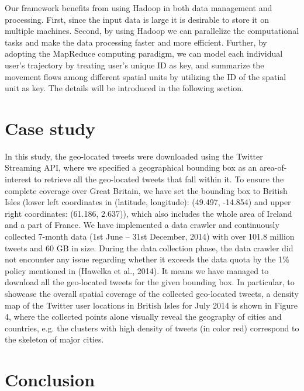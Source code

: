 \documentclass[a4paper,11pt]{article}
\begin{document}
Our framework benefits from using Hadoop in both data management and processing.
First, since the input data is large it is desirable to store it on multiple machines.
Second, by using Hadoop we can parallelize the computational tasks and make the data processing faster and more efficient.
Further, by adopting the MapReduce computing paradigm, we can model each individual user's trajectory by treating user's unique ID as key, and summarize the movement flows among different spatial units by utilizing the ID of the spatial unit as key. The details will be introduced in the following section.



\section*{Case study}
In this study, the geo-located tweets were downloaded using the Twitter Streaming API, where we specified a geographical bounding box as an area-of-interest to retrieve all the geo-located tweets that fall within it.
To ensure the complete coverage over Great Britain, we have set the bounding box to British Isles (lower left coordinates in (latitude, longitude): (49.497, -14.854) and upper right coordinates: (61.186, 2.637)), which also includes the whole area of Ireland and a part of France.
We have implemented a data crawler and continuously collected 7-month data (1st June – 31st December, 2014) with over 101.8 million tweets and 60 GB in size.
During the data collection phase, the data crawler did not encounter any issue regarding whether it exceeds the data quota by the 1$\%$ policy mentioned in (Hawelka et al., 2014).
It means we have managed to download all the geo-located tweets for the given bounding box.
In particular, to showcase the overall spatial coverage of the collected geo-located tweets, a density map of the Twitter user locations in British Isles for July 2014 is shown in Figure 4, where the collected points alone visually reveal the geography of cities and countries, e.g. the clusters with high density of tweets (in color red) correspond to the skeleton of major cities.

\cite{brockmann2006}

\section*{Conclusion}
\end{document}
